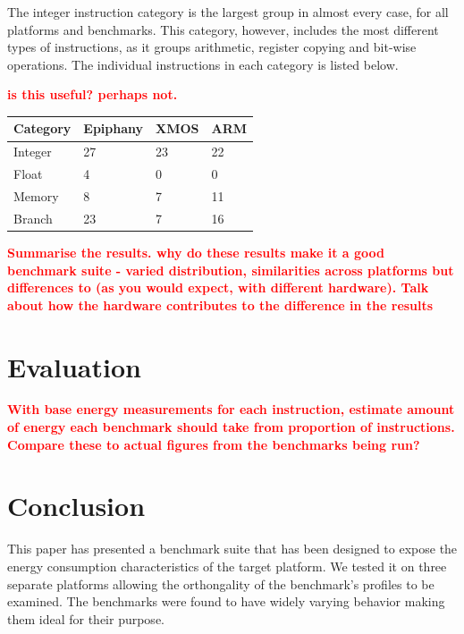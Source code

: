 \documentclass[twocolumn]{article}
\newcommand{\nsection}[1]{\section{\bfseries #1}}
\newcommand{\todo}[1]{\textbf{\textcolor{red}{#1}}}
\begin{document}
The integer instruction category is the largest group in almost every case, for all platforms and benchmarks. This category, however, includes the most different types of instructions, as it groups arithmetic, register copying and bit-wise operations. The individual instructions in each category is listed below.

\todo{is this useful? perhaps not.}

\begin{center}
	\begin{tabular}{l l l l}
		Category 	& Epiphany  & XMOS 	& ARM \\
		\hline
		Integer	 	& 27	  	& 23	& 22  \\
		Float		& 4			& 0		& 0	  \\
		Memory		& 8			& 7		& 11  \\
		Branch		& 23		& 7		& 16  \\
	\end{tabular}
\end{center}

\todo{Summarise the results. why do these results make it a good benchmark suite - varied distribution, similarities across platforms but differences to (as you would expect, with different hardware). Talk about how the hardware contributes to the difference in the results}

\nsection{Evaluation}

\todo{With base energy measurements for each instruction, estimate amount of energy each benchmark should take from proportion of instructions. Compare these to actual figures from the benchmarks being run?}

\nsection{Conclusion}

This paper has presented a benchmark suite that has been designed to expose the energy consumption characteristics of the target platform. We tested it on three separate platforms allowing the orthongality of the benchmark's profiles to be examined. The benchmarks were found to have widely varying behavior making them ideal for their purpose. \todo{}

\printbibliography
\end{document}
